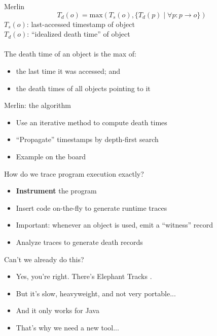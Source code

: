 \documentclass[11pt]{beamer}
\begin{document}
\begin{frame}{Merlin}
  \begin{equation*}
    T_d(o) = \mathrm{max}(T_s(o), \{T_d(p) \mid \forall p : p \rightarrow o\})
  \end{equation*}
  $T_s(o)$: last-accessed timestamp of object\\
  $T_d(o)$: ``idealized death time'' of object\\~\\
  \pause
  The death time of an object is the max of:
  \begin{itemize}
  \item the last time it was accessed; and
  \item the death times of all objects pointing to it
  \end{itemize}
\end{frame}

\begin{frame}{Merlin: the algorithm}
  \begin{itemize}
  \item Use an iterative method to compute death times
  \item ``Propagate'' timestamps by depth-first search
  \item Example on the board
  \end{itemize}
\end{frame}

\begin{frame}{How do we trace program execution exactly?}
  \begin{itemize}
  \item \textbf{Instrument} the program
    \pause
  \item Insert code on-the-fly to generate runtime traces
    \pause
  \item Important: whenever an object is used, emit a ``witness'' record
    \pause
  \item Analyze traces to generate death records
   
  \end{itemize}
\end{frame}

\begin{frame}{Can't we already do this?}
  \begin{itemize}
  \item Yes, you're right. There's Elephant Tracks \citep{ElephantTracks}.
    \pause
  \item But it's slow, heavyweight, and not very portable...
    \pause
  \item And it only works for Java
    \pause
  \item That's why we need a new tool...
  \end{itemize}
\end{frame}
\end{document}
